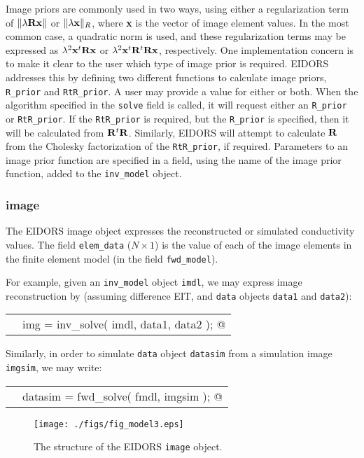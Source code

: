 \documentclass[12pt]{iopart}
\makeatletter
\newcommand{\CODEstart}{\medskip\begin{tabular}{ll}}
\newcommand{\CN}{\tt\scriptsize} %
\newcommand{\CC}{&\small\verb@}   % start code
\newcommand{\CODEend}{\end{tabular}\medskip}
\makeatother
\begin{document}
Image priors are commonly used in two ways, using either a 
regularization term of $\|\lambda{\bf R}{\bf x}\|$ or
% Damn! this _R doesn't work
% $\|\lambda{\bf x}\|_\mathbf{R}$, where {\bf x} is the vector
$\|\lambda{\bf x}\|_{R}$, where {\bf x} is the vector
of image element values. In the most common case, a 
quadratic norm is used, and these regularization terms
may be expressed as  $\lambda^2{\bf x}^t{\bf R}{\bf x}$
or $\lambda^2{\bf x}^t{\bf R}^t{\bf R}{\bf x}$, respectively.
One implementation concern is to make it clear to the
user which type of image prior is required. EIDORS
addresses this by defining two different functions to
calculate image priors, {\tt R\_prior} and {\tt RtR\_prior}.
A user may provide a value for either or both. When the algorithm
specified in the {\tt solve} field is called, it will request
either an {\tt R\_prior} or {\tt RtR\_prior}. If the 
{\tt RtR\_prior} is required, but the {\tt R\_prior} 
is specified, then it will be calculated from ${\bf R}^t{\bf R}$.
Similarly, EIDORS will attempt to calculate ${\bf R}$ 
from the Cholesky factorization of the {\tt RtR\_prior},
if required. Parameters to an image prior function are
specified in a field, using the name of the image prior function,
added to the {\tt inv\_model} object.

\subsubsection{image}

The EIDORS image object expresses the reconstructed or
simulated conductivity values. The field {\tt elem\_data}
($N\times1$) is the value of each of the image elements in 
the finite element model (in the field {\tt fwd\_model}).

For example, given
an {\tt inv\_model} object {\tt imdl}, we may express
image reconstruction by (assuming
difference EIT, and {\tt data} objects {\tt data1} and {\tt data2}):

\CODEstart
\CN    \CC img = inv_solve( imdl, data1, data2 ); @\\[-3pt]
\CODEend

Similarly, in order to simulate {\tt data} object {\tt datasim}
from a simulation image {\tt imgsim}, we may write:

\CODEstart
\CN    \CC datasim = fwd_solve( fmdl, imgsim ); @\\[-3pt]
\CODEend

%
%
\begin{figure}[th]
\begin{flushright}
\texttt{[image: ./figs/fig\_model3.eps]}
\caption{\small The structure of the EIDORS {\tt image} object.
\label{fig:image}
 }
\end{flushright}
\end{figure}
\end{document}
